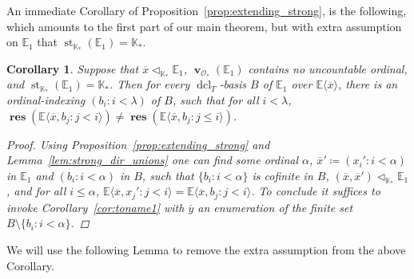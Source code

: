 \documentclass{amsart}
\newtheorem{corollary}[theorem]{Corollary}
\theoremstyle{remark}
\theoremstyle{definition}
\theoremstyle{plain}
\newcommand{\bE}{\mathbb E}
\newcommand{\bK}{\mathbb K}
\newcommand{\cO}{\mathcal O}
\DeclareMathOperator{\val}{\mathbf{v}}
\DeclareMathOperator{\res}{\mathbf{res}}
\DeclareMathOperator{\std}{\mathrm{st}}
\DeclareMathOperator{\dcl}{\mathrm{dcl}}
\theoremstyle{plain}
\begin{document}
An immediate Corollary of Proposition~\ref{prop:extending_strong}, is the following, which amounts to the first part of our main theorem, but with extra assumption on $\bE_1$ that $\std_{\bK_*}(\bE_1)=\bK_*$.

\begin{corollary}\label{cor:mainthm_with_extra_hyp}
    Suppose that $\overline{x} \triangleleft_{\bK_*} \bE_1$, $\val_{\cO_*}(\bE_1)$ contains no uncountable ordinal, and $\std_{\bK_*}(\bE_1)=\bK_*$. Then for every $\dcl_T$-basis $B$ of $\bE_1$ over $\bE\langle \overline{x} \rangle$, there is an ordinal-indexing $(b_i: i <\lambda)$ of $B$, such that for all $i<\lambda$, $\res(\bE \langle \overline{x}, b_j: j<i\rangle) \neq \res(\bE \langle \overline{x}, b_j: j\le i\rangle)$.
    \begin{proof}
        Using Proposition~\ref{prop:extending_strong} and Lemma~\ref{lem:strong_dir_unions} one can find some ordinal $\alpha$, $\overline{x}'\coloneqq (x_i': i< \alpha)$ in $\bE_1$ and $(b_i: i< \alpha)$ in $B$, such that $\{b_i: i <\alpha\}$ is cofinite in $B$, $(\overline{x}, \overline{x}')\triangleleft_{\bK_*} \bE_1$, and for all $i\le\alpha$, $\bE \langle \overline{x}, x_j':j<i\rangle = \bE \langle \overline{x}, b_j:j<i\rangle$. To conclude it suffices to invoke Corollary~\ref{cor:toname1} with $\overline{y}$ an enumeration of the finite set $B \setminus \{b_i : i< \alpha\}$.
    \end{proof}
\end{corollary}

We will use the following Lemma to remove the extra assumption from the above Corollary.
\end{document}
